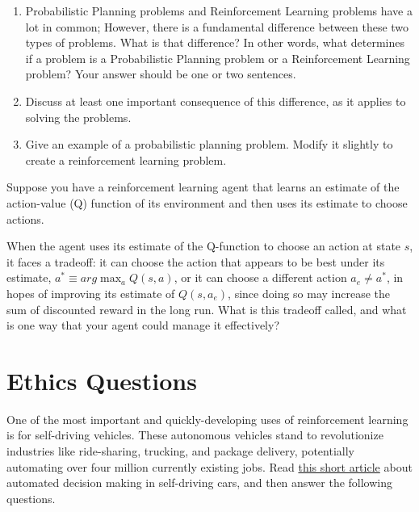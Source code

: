 \documentclass{article}
\begin{document}
\item
  
\begin{enumerate}
\item Probabilistic Planning problems and Reinforcement Learning
  problems have a lot in common; However, there is a fundamental
  difference between these two types of problems. What is that
  difference? In other words, what determines if a problem is a
  Probabilistic Planning problem or a Reinforcement Learning problem?
  Your answer should be one or two sentences.

\item Discuss at least one important consequence of this difference,
  as it applies to solving the problems.

\item Give an example of a probabilistic planning problem. Modify it
  slightly to create a reinforcement learning problem.  
\end{enumerate}

\item Suppose you have a reinforcement learning agent that learns an
  estimate of the action-value (Q) function of its environment and
  then uses its estimate to choose actions.

  When the agent uses its estimate of the Q-function to choose an
  action at state $s$, it faces a tradeoff: it can choose the action
  that appears to be best under its estimate, $a^* \equiv arg\max_a
  {Q(s, a)}$, or it can choose a different action $a_e \neq a^*$, in
  hopes of improving its estimate of $Q(s, a_e)$, since doing so may
  increase the sum of discounted reward in the long run. What is
  this tradeoff called, and what is one way that your agent could
  manage it effectively?
\fi
    

\section{Ethics Questions}
One of the most important and quickly-developing uses of reinforcement
learning is for self-driving vehicles. These autonomous vehicles stand
to revolutionize industries like ride-sharing, trucking, and package
delivery, potentially automating over four million currently existing
jobs.  Read
\href{https://www.technologyreview.com/2018/10/24/139313/a-global-ethics-study-aims-to-help-ai-solve-the-self-driving-trolley-problem/}{this
  short article} about automated decision making in self-driving cars,
and then answer the following questions.
\end{document}
